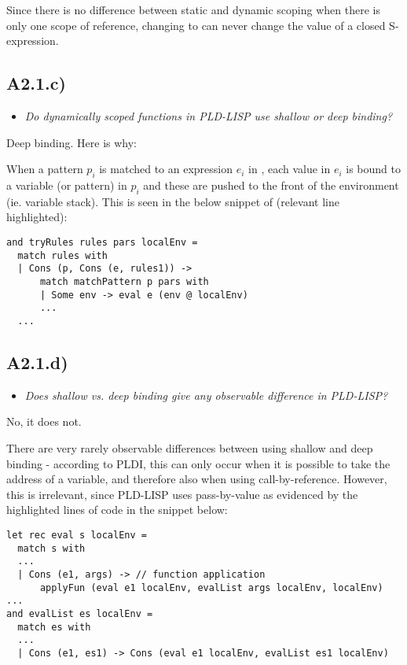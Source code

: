 \smallskip

Since there is no difference between static and dynamic scoping
when there is only one scope of reference, changing  to 
can never change the value of a closed S-expression.

\sectend

\subsection{A2.1.c)}

\begin{itemize}
    \item \emph{Do dynamically scoped functions in PLD-LISP use shallow or deep
        binding?}
\end{itemize}

Deep binding. Here is why:

\smallskip

When a pattern $p_i$ is matched to an expression $e_i$ in , each
value in $e_i$ is bound to a variable (or pattern) in $p_i$ and these are pushed
to the front of the environment (ie. variable stack). This is seen in the below
snippet of  (relevant line highlighted):

\begin{verbatim}
and tryRules rules pars localEnv =
  match rules with
  | Cons (p, Cons (e, rules1)) ->
      match matchPattern p pars with
      | Some env -> eval e (env @ localEnv)
      ...
  ...
\end{verbatim}

\newpage

\subsection{A2.1.d)}

\begin{itemize}
    \item \emph{Does shallow vs. deep binding give any observable difference in
        PLD-LISP?}
\end{itemize}

No, it does not. 

\smallskip

There are very rarely observable differences between using shallow and deep
binding - according to PLDI, this can only occur when it is possible to take the
address of a variable, and therefore also when using call-by-reference. However,
this is irrelevant, since PLD-LISP uses pass-by-value as evidenced by the
highlighted lines of code in the snippet below:

\begin{verbatim}
let rec eval s localEnv =
  match s with
  ...
  | Cons (e1, args) -> // function application
      applyFun (eval e1 localEnv, evalList args localEnv, localEnv)
...
and evalList es localEnv =
  match es with
  ...
  | Cons (e1, es1) -> Cons (eval e1 localEnv, evalList es1 localEnv)
\end{verbatim}


\Sectend
